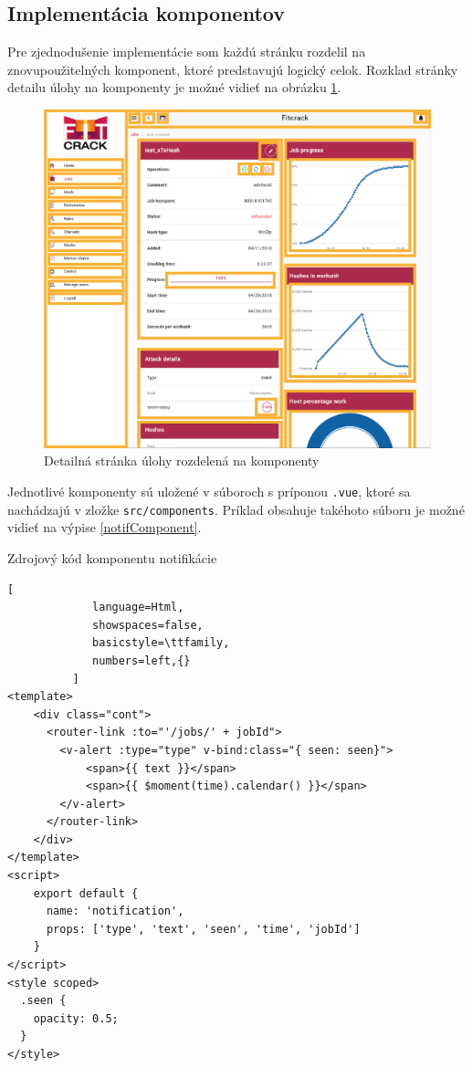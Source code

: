 \documentclass[slovak]{fitthesis}
\begin{document}
\subsection{Implementácia komponentov}
Pre zjednodušenie implementácie som každú stránku rozdelil na znovupoužitelných komponent, ktoré predstavujú logický celok. Rozklad stránky detailu úlohy na komponenty je možné vidieť na obrázku \ref{fig:komponenty}.
\begin{figure}[H]
    \centering
    \includegraphics[scale=0.45]{obrazky/komponenty.png}
    \caption{Detailná stránka úlohy rozdelená na komponenty}
    \label{fig:komponenty}
\end{figure}
Jednotlivé komponenty sú uložené v súboroch s príponou \texttt{.vue}, ktoré sa nachádzajú v zložke \texttt{src/components}. Príklad obsahuje takéhoto súboru je možné vidieť na výpise \ref{notifComponent}.

\begin{algorithm}[H]
  \caption{Zdrojový kód komponentu notifikácie}
  \label{notifComponent}
  \begin{lstlisting}[
             language=Html,
             showspaces=false,
             basicstyle=\ttfamily,
             numbers=left,{}
          ]
<template>
    <div class="cont">
      <router-link :to="'/jobs/' + jobId">
        <v-alert :type="type" v-bind:class="{ seen: seen}">
            <span>{{ text }}</span>
            <span>{{ $moment(time).calendar() }}</span>
        </v-alert>
      </router-link>
    </div>
</template>
<script>
    export default {
      name: 'notification',
      props: ['type', 'text', 'seen', 'time', 'jobId']
    }
</script>
<style scoped>
  .seen {
    opacity: 0.5;
  }
</style>
  \end{lstlisting}
\end{algorithm}
\end{document}

